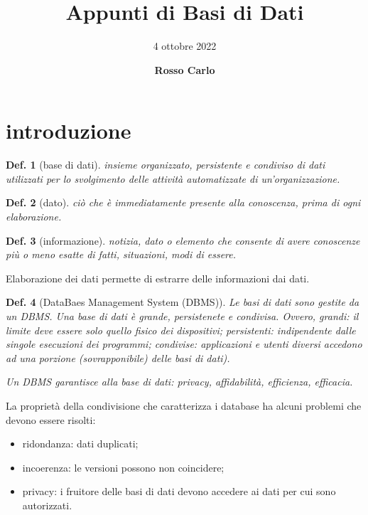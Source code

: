 \documentclass{article}
\title{\vspace{2cm}\textbf{Appunti di Basi di Dati}}
\author{\vspace{3mm}4 ottobre 2022}
\date{\vspace{3mm} \textbf{Rosso Carlo}}
\newtheorem{definition}{Def.}[section]
\begin{document}
\begin{titlepage}
	\maketitle
	\thispagestyle{empty}
\end{titlepage}
\tableofcontents
\newpage

\section{introduzione}
\begin{definition}[base di dati]
	insieme organizzato, persistente e condiviso di dati utilizzati per lo
	svolgimento delle attività \textit{automatizzate} di un'organizzazione.
\end{definition}

\begin{definition}[dato]
	ciò che è immediatamente presente alla conoscenza, prima di ogni
	elaborazione.
\end{definition}

\begin{definition}[informazione]
	notizia, dato o elemento che consente di avere conoscenze più o meno esatte
	di fatti, situazioni, modi di essere.
\end{definition}

Elaborazione dei dati permette di estrarre delle informazioni dai dati.

\begin{definition}[DataBaes Management System (DBMS)]
	Le basi di dati sono gestite da un DBMS. Una base di dati è grande,
	persistenete e condivisa. 
	Ovvero, grandi: il limite deve essere solo quello fisico dei dispositivi;
	persistenti: indipendente dalle singole esecuzioni dei programmi; condivise:
	applicazioni e utenti diversi accedono ad una porzione (sovrapponibile)
	delle basi di dati).

	Un DBMS garantisce alla base di dati: privacy,
	affidabilità, efficienza, efficacia.
\end{definition}

La proprietà della condivisione che caratterizza i database ha alcuni problemi
che devono essere risolti:
\begin{itemize}
	\item ridondanza: dati duplicati;
	
	\item incoerenza: le versioni possono non coincidere;

	\item privacy: i fruitore delle basi di dati devono accedere ai dati per cui
		sono autorizzati.
\end{itemize}
\end{document}
